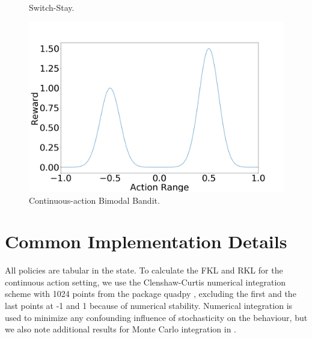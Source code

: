 \documentclass[\main/thesis.tex]{subfiles}
\begin{document}
\begin{figure}[!htb]
  \hspace*{10em}
    \caption{Switch-Stay.}
    \label{fig:switch-stay}
\end{figure}%

\begin{figure}[!htb]
    \centering
    \includegraphics[width=0.7\linewidth]{figs/bandit/bimodal-bandit.png}
    \caption{Continuous-action Bimodal Bandit.}
    \label{fig:bimodal-bandit}
\end{figure}


\section{Common Implementation Details}
\noindent All policies are tabular in the state. To calculate the FKL and RKL for the continuous action setting, we use the Clenshaw-Curtis \citep{clenshaw1960method} numerical integration scheme with 1024 points from the package quadpy \citep{schlomerquadpy}, excluding the first and the last points at -1 and 1 because of numerical stability. Numerical integration is used to minimize any confounding influence of stochasticity on the behaviour, but we also note additional results for Monte Carlo integration in .
\end{document}
